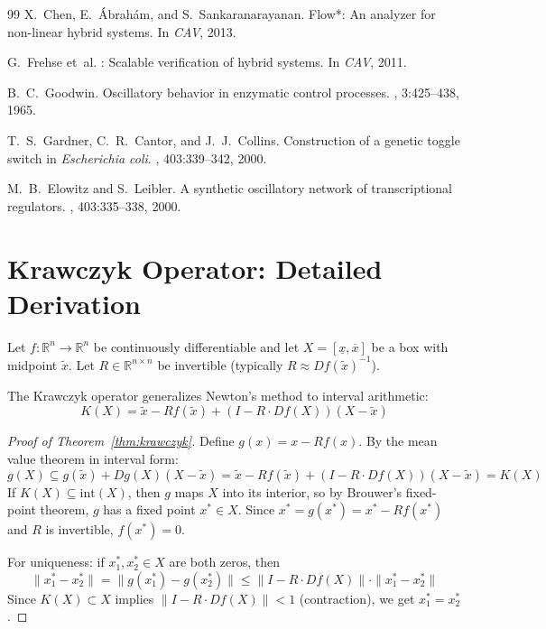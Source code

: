 \documentclass[11pt]{article}
\newcommand{\R}{\mathbb{R}}
\newcommand{\norm}[1]{\|#1\|}
\begin{document}
\begin{thebibliography}{99}
X.~Chen, E.~{\'A}brah{\'a}m, and S.~Sankaranarayanan.
\newblock Flow*: An analyzer for non-linear hybrid systems.
\newblock In {\em CAV}, 2013.

G.~Frehse et~al.
: Scalable verification of hybrid systems.
\newblock In {\em CAV}, 2011.

B.~C.~Goodwin.
\newblock Oscillatory behavior in enzymatic control processes.
, 3:425--438, 1965.

T.~S.~Gardner, C.~R.~Cantor, and J.~J.~Collins.
\newblock Construction of a genetic toggle switch in \emph{Escherichia coli}.
, 403:339--342, 2000.

M.~B.~Elowitz and S.~Leibler.
\newblock A synthetic oscillatory network of transcriptional regulators.
, 403:335--338, 2000.
\end{thebibliography}

\appendix

\section{Krawczyk Operator: Detailed Derivation}
\label{app:krawczyk}

Let $f: \R^n \to \R^n$ be continuously differentiable and let $X = [\underline{x}, \overline{x}]$ be a box with midpoint $\tilde{x}$.
Let $R \in \R^{n \times n}$ be invertible (typically $R \approx Df(\tilde{x})^{-1}$).

The Krawczyk operator generalizes Newton's method to interval arithmetic:
\[
K(X) = \tilde{x} - R f(\tilde{x}) + (I - R \cdot Df(X))(X - \tilde{x})
\]

\begin{proof}[Proof of Theorem~\ref{thm:krawczyk}]
Define $g(x) = x - Rf(x)$.
By the mean value theorem in interval form:
\[
g(X) \subseteq g(\tilde{x}) + Dg(X)(X - \tilde{x}) = \tilde{x} - Rf(\tilde{x}) + (I - R \cdot Df(X))(X - \tilde{x}) = K(X)
\]
If $K(X) \subseteq \mathrm{int}(X)$, then $g$ maps $X$ into its interior, so by Brouwer's fixed-point theorem, $g$ has a fixed point $x^* \in X$.
Since $x^* = g(x^*) = x^* - Rf(x^*)$ and $R$ is invertible, $f(x^*) = 0$.

For uniqueness: if $x_1^*, x_2^* \in X$ are both zeros, then
\[
\norm{x_1^* - x_2^*} = \norm{g(x_1^*) - g(x_2^*)} \leq \norm{I - R \cdot Df(X)} \cdot \norm{x_1^* - x_2^*}
\]
Since $K(X) \subset X$ implies $\norm{I - R \cdot Df(X)} < 1$ (contraction), we get $x_1^* = x_2^*$.
\end{proof}
\end{document}
